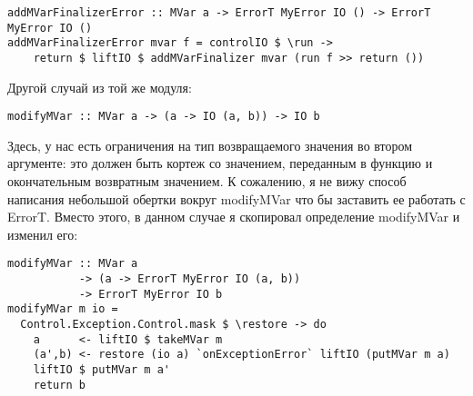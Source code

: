 \begin{lstlisting}
addMVarFinalizerError :: MVar a -> ErrorT MyError IO () -> ErrorT MyError IO ()
addMVarFinalizerError mvar f = controlIO $ \run ->
    return $ liftIO $ addMVarFinalizer mvar (run f >> return ())
\end{lstlisting}

Другой случай из той же модуля:

\begin{lstlisting}
modifyMVar :: MVar a -> (a -> IO (a, b)) -> IO b
\end{lstlisting}

Здесь, у нас есть ограничения на тип возвращаемого значения во втором аргументе: это должен быть кортеж со значением, переданным в функцию и окончательным возвратным значением. К сожалению, я не вижу способ написания небольшой обертки вокруг modifyMVar что бы заставить ее работать с ErrorT. Вместо этого, в данном случае я скопировал определение modifyMVar и изменил его:

\begin{lstlisting}
modifyMVar :: MVar a
           -> (a -> ErrorT MyError IO (a, b))
           -> ErrorT MyError IO b
modifyMVar m io =
  Control.Exception.Control.mask $ \restore -> do
    a      <- liftIO $ takeMVar m
    (a',b) <- restore (io a) `onExceptionError` liftIO (putMVar m a)
    liftIO $ putMVar m a'
    return b
\end{lstlisting}

